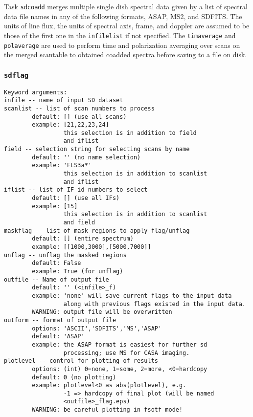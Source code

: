           Task {\tt sdcoadd} merges multiple single dish spectral data given by
          a list of spectral data file names in any of the following formats,
          ASAP, MS2, and SDFITS.
          The units of line flux, the units of spectral axis, frame, and doppler
          are assumed to be those of the first one in the {\tt infilelist} if not
          specified.
          The {\tt timaverage} and {\tt polaverage} are used to perform time
          and polarization averaging over scans on the merged scantable to 
          obtained coadded spectra before saving to a file on disk.


\subsubsection{{\tt sdflag}}
\label{section:sd.sdtasks.tasks.sdflag}

\begin{verbatim}
Keyword arguments:
infile -- name of input SD dataset
scanlist -- list of scan numbers to process
        default: [] (use all scans)
        example: [21,22,23,24]
                 this selection is in addition to field
                 and iflist
field -- selection string for selecting scans by name
        default: '' (no name selection)
        example: 'FLS3a*'
                 this selection is in addition to scanlist
                 and iflist
iflist -- list of IF id numbers to select
        default: [] (use all IFs)
        example: [15]
                 this selection is in addition to scanlist
                 and field
maskflag -- list of mask regions to apply flag/unflag
        default: [] (entire spectrum)
        example: [[1000,3000],[5000,7000]]
unflag -- unflag the masked regions
        default: False
        example: True (for unflag)
outfile -- Name of output file
        default: '' (<infile>_f)
        example: 'none' will save current flags to the input data
                 along with previous flags existed in the input data.
        WARNING: output file will be overwritten
outform -- format of output file
        options: 'ASCII','SDFITS','MS','ASAP'
        default: 'ASAP'
        example: the ASAP format is easiest for further sd
                 processing; use MS for CASA imaging.
plotlevel -- control for plotting of results
        options: (int) 0=none, 1=some, 2=more, <0=hardcopy
        default: 0 (no plotting)
        example: plotlevel<0 as abs(plotlevel), e.g.
                 -1 => hardcopy of final plot (will be named
                 <outfile>_flag.eps)
        WARNING: be careful plotting in fsotf mode!

\end{verbatim}

